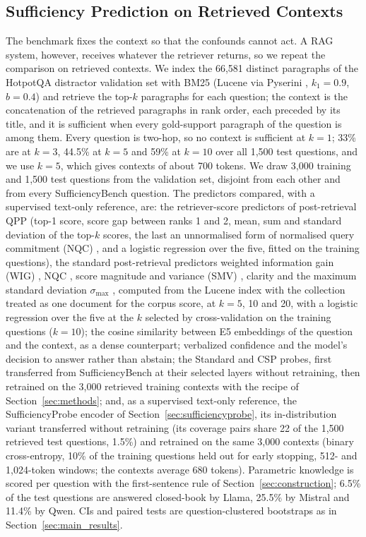 \documentclass[acmsmall,screen,review]{acmart}
\newcommand{\bench}{SufficiencyBench}
\newcommand{\sprobe}{SufficiencyProbe}
\begin{document}
\subsection{Sufficiency Prediction on Retrieved Contexts}
\label{sec:retrieved}
The benchmark fixes the context so that the confounds cannot act. A RAG system, however, receives whatever the retriever returns, so we repeat the comparison on retrieved contexts. We index the 66,581 distinct paragraphs of the HotpotQA distractor validation set with BM25 \citep{robertson2009bm25} (Lucene via Pyserini \citep{lin2021pyserini}, $k_1 = 0.9$, $b = 0.4$) and retrieve the top-$k$ paragraphs for each question; the context is the concatenation of the retrieved paragraphs in rank order, each preceded by its title, and it is sufficient when every gold-support paragraph of the question is among them. Every question is two-hop, so no context is sufficient at $k = 1$; 33\% are at $k = 3$, 44.5\% at $k = 5$ and 59\% at $k = 10$ over all 1,500 test questions, and we use $k = 5$, which gives contexts of about 700 tokens. We draw 3,000 training and 1,500 test questions from the validation set, disjoint from each other and from every \bench{} question. The predictors compared, with a supervised text-only reference, are: the retriever-score predictors of post-retrieval QPP (top-1 score, score gap between ranks 1 and 2, mean, sum and standard deviation of the top-$k$ scores, the last an unnormalised form of normalised query commitment (NQC) \citep{shtok2012predicting}, and a logistic regression over the five, fitted on the training questions), the standard post-retrieval predictors weighted information gain (WIG) \citep{zhou2007query}, NQC \citep{shtok2012predicting}, score magnitude and variance (SMV) \citep{tao2014smv}, clarity \citep{cronentownsend2002predicting} and the maximum standard deviation $\sigma_{\max}$ \citep{perez2010stddev}, computed from the Lucene index with the collection treated as one document for the corpus score, at $k = 5$, 10 and 20, with a logistic regression over the five at the $k$ selected by cross-validation on the training questions ($k = 10$); the cosine similarity between E5 embeddings \citep{wang2022e5} of the question and the context, as a dense counterpart; verbalized confidence and the model's decision to answer rather than abstain; the Standard and CSP probes, first transferred from \bench{} at their selected layers without retraining, then retrained on the 3,000 retrieved training contexts with the recipe of Section~\ref{sec:methods}; and, as a supervised text-only reference, the \sprobe{} encoder of Section~\ref{sec:sufficiencyprobe}, its in-distribution variant transferred without retraining (its coverage pairs share 22 of the 1,500 retrieved test questions, 1.5\%) and retrained on the same 3,000 contexts (binary cross-entropy, 10\% of the training questions held out for early stopping, 512- and 1,024-token windows; the contexts average 680 tokens). Parametric knowledge is scored per question with the first-sentence rule of Section~\ref{sec:construction}; 6.5\% of the test questions are answered closed-book by Llama, 25.5\% by Mistral and 11.4\% by Qwen. CIs and paired tests are question-clustered bootstraps as in Section~\ref{sec:main_results}.
\end{document}
